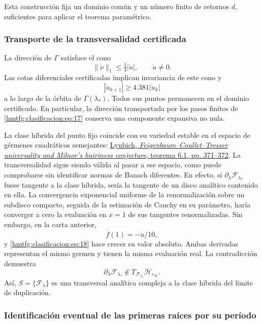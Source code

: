 Esta construcción fija un dominio común y un número finito de retornos \(d\), suficientes para aplicar el teorema paramétrico.

\subsubsection{Transporte de la transversalidad certificada}
\label{hmtfg:clasificacion:8.2}

La dirección de \(\Gamma\) satisface el cono
\[
\|\dot\nu\|_1\le\tfrac14|\dot u|,\qquad \dot u\ne0.
\]
Las cotas diferenciales certificadas implican invariancia de este cono y
\begin{equation}
|\dot u_{k+1}|\ge4.381|\dot u_k|
\label{hmtfg:clasificacion:eq:18}
\end{equation}
a lo largo de la órbita de \(\Gamma(\lambda_*)\). Todos sus puntos permanecen en el dominio certificado. En particular, la dirección transportada por los pasos finitos de \eqref{hmtfg:clasificacion:eq:17} conserva una componente expansiva no nula.

La clase híbrida del punto fijo coincide con su variedad estable en el espacio de gérmenes cuadráticos semejantes: \href{https://www.maths.tcd.ie/EMIS/journals/Annals/149_2/lyubich.pdf}{Lyubich, \emph{Feigenbaum–Coullet–Tresser universality and Milnor's hairiness conjecture}, teorema 6.1, pp. 371–372}. La transversalidad sigue siendo válida al pasar a ese espacio, como puede comprobarse sin identificar normas de Banach diferentes. En efecto, si \(\partial_\lambda\mathcal F_{\lambda_*}\) fuese tangente a la clase híbrida, sería la tangente de un disco analítico contenido en ella. La convergencia exponencial uniforme de la renormalización sobre un subdisco compacto, seguida de la estimación de Cauchy en su parámetro, haría converger a cero la evaluación en \(x=1\) de sus tangentes renormalizadas. Sin embargo, en la carta anterior,
\[
\dot f(1)=-\dot u/10,
\]
y \eqref{hmtfg:clasificacion:eq:18} hace crecer su valor absoluto. Ambas derivadas representan el mismo germen y tienen la misma evaluación real. La contradicción demuestra
\begin{equation}
\partial_\lambda\mathcal F_{\lambda_*}
\notin T_{\mathcal F_{\lambda_*}}\mathcal H_{c_\infty}.
\label{hmtfg:clasificacion:eq:19}
\end{equation}
Así, \(S=\{\mathcal F_\lambda\}\) es una transversal analítica compleja a la clase híbrida del límite de duplicación.

\subsubsection{Identificación eventual de las primeras raíces por su período}
\label{hmtfg:clasificacion:8.3}

